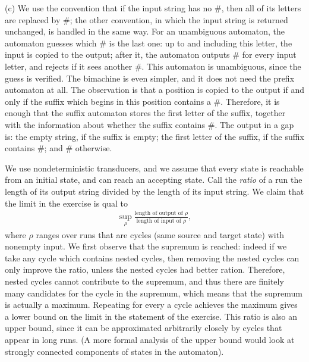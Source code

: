 {%
    (c) We use the convention that if the input string has no $\#$, then all of its letters are replaced by $\#$; the other convention, in which the input string is returned unchanged, is handled in the same way. For an unambiguous automaton, the automaton guesses which $\#$ is the last one: up to and including this letter, the input is copied to the output; after it, the automaton outputs $\#$ for every input letter, and rejects if it sees another $\#$. This automaton is unambiguous, since the guess is verified. The bimachine is even simpler, and it does not need the prefix automaton at all. The observation is that a position is copied to the output if and only if the suffix which begins in this position contains a $\#$. Therefore, it is enough that the suffix automaton stores the first letter of the suffix, together with the information about whether the suffix contains $\#$. The output in a gap is: the empty string, if the suffix is empty; the first letter of the suffix, if the suffix contains $\#$; and $\#$ otherwise.
}

 {We use nondeterministic transducers, and we assume that every state is reachable from an initial state, and can reach an accepting state. Call the \emph{ratio} of a run the length of its output string divided by the length of its input string. We claim that the limit in the exercise is qual to 
\begin{align*}
    \sup_\rho \frac{\text{length of output of $\rho$}}{\text{length of input of $\rho$}},
\end{align*}
where $\rho$ ranges over runs that are cycles (same source and target state) with nonempty input. We first observe that the supremum is reached: indeed if we take any cycle which contains nested cycles, then removing the nested cycles can only improve the ratio, unless the nested cycles had better ration. Therefore, nested cycles cannot contribute to the supremum, and thus there are finitely many candidates for the cycle in the supremum, which means that the supremum is actually a maximum. Repeating for every a cycle achieves the maximum gives a lower bound on the limit in the statement of the exercise. This ratio is also an upper bound, since it can be approximated arbitrarily closely by cycles that appear in long runs. (A more formal analysis of the upper bound would look at strongly connected components of states in the automaton).
}

